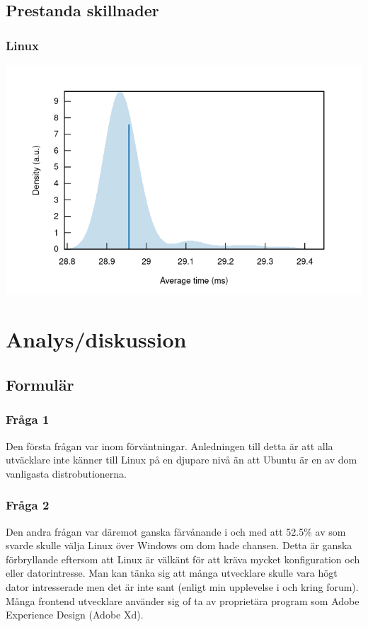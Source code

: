 \documentclass[12pt, a4paper]{report}
\begin{document}
   \vspace{1cm}

   \subsection{Prestanda skillnader}

   \subsubsection{Linux}
   \includegraphics[width=1\textwidth]{bench_linux_average_time}


\section{Analys/diskussion}

\subsection{Formulär}

\subsubsection{Fråga 1}
Den första frågan var inom förväntningar. Anledningen till detta är att alla utväcklare inte känner till Linux på en djupare nivå än att Ubuntu är en av dom vanligasta distrobutionerna\cite{commondistro}.

\subsubsection{Fråga 2}
Den andra frågan var däremot ganska fårvånande i och med att 52.5\% av som svarde skulle välja Linux över Windows om dom hade chansen. Detta är ganska förbryllande eftersom att Linux är välkänt för att kräva mycket konfiguration och eller datorintresse. Man kan tänka sig att många utvecklare skulle vara högt dator intresserade men det är inte sant (enligt min upplevelse i och kring forum). Många frontend utvecklare använder sig of ta av proprietära program som Adobe Experience Design (Adobe Xd). 
\end{document}

